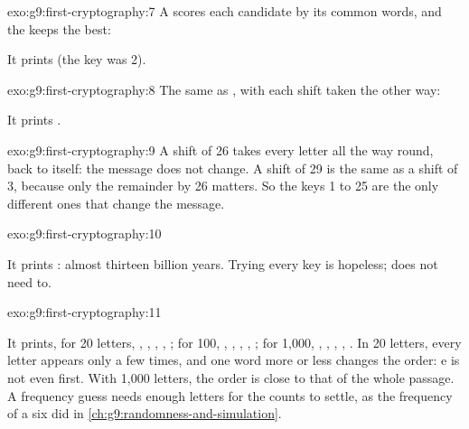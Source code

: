 \begin{solution}{exo:g9:first-cryptography:7}
A  scores each candidate by its common words, and the  keeps the
best:

\label{lst:g9:first-cryptography:sol-best}

It prints  (the key was 2).
\end{solution}

\begin{solution}{exo:g9:first-cryptography:8}
The same  as , with each shift taken the other way:

\label{lst:g9:first-cryptography:sol-keyword}

It prints .
\end{solution}

\begin{solution}{exo:g9:first-cryptography:9}
A shift of 26 takes every letter all the way round, back to itself: the message
does not change. A shift of 29 is the same as a shift of 3, because only the
remainder by 26 matters. So the keys 1 to 25 are the only different ones that
change the message.
\end{solution}

\begin{solution}{exo:g9:first-cryptography:10}
\label{lst:g9:first-cryptography:sol-time}

It prints : almost thirteen billion years. Trying
every key is hopeless;  does not need to.
\end{solution}

\begin{solution}{exo:g9:first-cryptography:11}
\label{lst:g9:first-cryptography:sol-short}

It prints, for 20 letters, , , , ,
; for 100, , , , ,
; for 1,000, , , , ,
. In 20 letters, every letter appears only a few times, and one word
more or less changes the order: e is not even first. With 1,000 letters, the
order is close to that of the whole passage. A frequency guess needs enough
letters for the counts to settle, as the frequency of a six did in
\cref{ch:g9:randomness-and-simulation}.
\end{solution}

